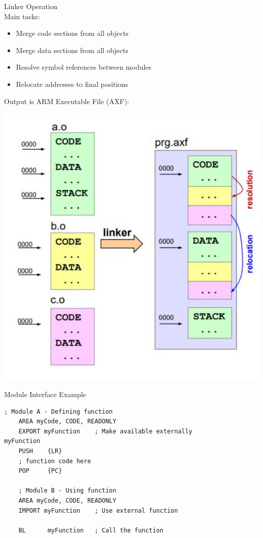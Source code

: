 \begin{concept}{Linker Operation}\\
Main tasks:
\begin{itemize}
  \item Merge code sections from all objects
  \item Merge data sections from all objects
  \item Resolve symbol references between modules
  \item Relocate addresses to final positions
\end{itemize}

Output is ARM Executable File (AXF):

\includegraphics[width=\linewidth]{images/2024_12_29_79e6b22f503fb7b4f718g-10}
\end{concept}

\begin{example2}{Module Interface Example}
\begin{lstlisting}[language=armasm, style=basesmol]
    ; Module A - Defining function
    AREA myCode, CODE, READONLY
    EXPORT myFunction    ; Make available externally
myFunction
    PUSH    {LR}
    ; function code here
    POP     {PC}
    
    ; Module B - Using function
    AREA myCode, CODE, READONLY
    IMPORT myFunction    ; Use external function
    
    BL      myFunction   ; Call the function
\end{lstlisting}
\end{example2}

